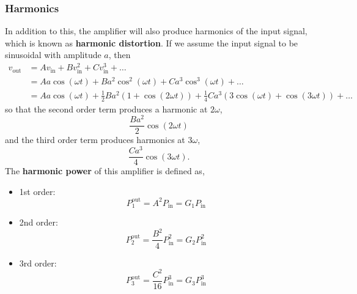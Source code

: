 \documentclass{article}
\begin{document}
\subsubsection{Harmonics}
In addition to this, the amplifier will also produce harmonics of the
input signal, which is known as \textbf{harmonic distortion}. If we
assume the input signal to be sinusoidal with amplitude \(a\), then
\begin{align*}
    v_{\mathrm{out}} & = A v_{\mathrm{in}} + B v_{\mathrm{in}}^2 + C v_{\mathrm{in}}^3 + \ldots                                                                                                                                               \\
                     & = A a \cos{\left( \omega t \right)} + B a^2 \cos^2{\left( \omega t \right)} + C a^3 \cos^3{\left( \omega t \right)} + \ldots                                                                                           \\
                     & = A a \cos{\left( \omega t \right)} + \frac{1}{2} B a^2 \left( 1 + \cos{\left( 2\omega t \right)} \right) + \frac{1}{4} C a^3 \left( 3 \cos{\left( \omega t \right)} + \cos{\left( 3\omega t \right)} \right) + \ldots
\end{align*}
so that the second order term produces a harmonic at \(2\omega\),
\begin{equation*}
    \frac{B a^2}{2} \cos{\left( 2\omega t \right)}
\end{equation*}
and the third order term produces harmonics at \(3\omega\),
\begin{equation*}
    \frac{C a^3}{4} \cos{\left( 3\omega t \right)}.
\end{equation*}
The \textbf{harmonic power} of this amplifier is defined as,
\begin{itemize}
    \item 1st order:
          \begin{equation*}
              P_1^{\mathrm{out}} = A^2 P_{\mathrm{in}} = G_1 P_{\mathrm{in}}
          \end{equation*}
    \item 2nd order:
          \begin{equation*}
              P_2^{\mathrm{out}} = \frac{B^2}{4} P_{\mathrm{in}}^2 = G_2 P_{\mathrm{in}}^2
          \end{equation*}
    \item 3rd order:
          \begin{equation*}
              P_3^{\mathrm{out}} = \frac{C^2}{16} P_{\mathrm{in}}^3 = G_3 P_{\mathrm{in}}^3
          \end{equation*}
\end{itemize}
\end{document}
